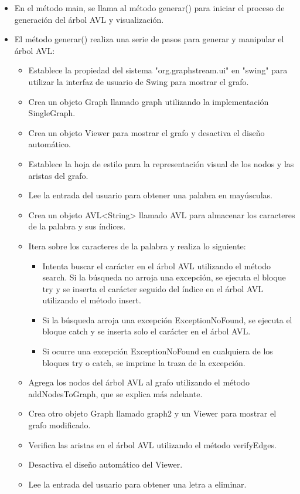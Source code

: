 \documentclass{article}
\begin{document}
\begin{itemize}
	\item En el método main, se llama al método generar() para iniciar el proceso de generación del árbol AVL y visualización.
	\item El método generar() realiza una serie de pasos para generar y manipular el árbol AVL:
	\begin{itemize}
	\item Establece la propiedad del sistema "org.graphstream.ui" en "swing" para utilizar la interfaz de usuario de Swing para mostrar el grafo.
	\item Crea un objeto Graph llamado graph utilizando la implementación SingleGraph.
	\item Crea un objeto Viewer para mostrar el grafo y desactiva el diseño automático.
	\item Establece la hoja de estilo para la representación visual de los nodos y las aristas del grafo.
	\item Lee la entrada del usuario para obtener una palabra en mayúsculas.
	\item Crea un objeto AVL<String> llamado AVL para almacenar los caracteres de la palabra y sus índices.
	\item Itera sobre los caracteres de la palabra y realiza lo siguiente:
	\begin{itemize}
	\item Intenta buscar el carácter en el árbol AVL utilizando el método search. Si la búsqueda no arroja una excepción, se ejecuta el bloque try y se inserta el carácter seguido del índice en el árbol AVL utilizando el método insert.
	\item Si la búsqueda arroja una excepción ExceptionNoFound, se ejecuta el bloque catch y se inserta solo el carácter en el árbol AVL.
	\item Si ocurre una excepción ExceptionNoFound en cualquiera de los bloques try o catch, se imprime la traza de la excepción.
	\end{itemize}
	\item Agrega los nodos del árbol AVL al grafo utilizando el método addNodesToGraph, que se explica más adelante.
	\item Crea otro objeto Graph llamado graph2 y un Viewer para mostrar el grafo modificado.
	\item Verifica las aristas en el árbol AVL utilizando el método verifyEdges.
	\item Desactiva el diseño automático del Viewer.
	\item Lee la entrada del usuario para obtener una letra a eliminar.

\end{itemize}
\end{itemize}
\end{document}
